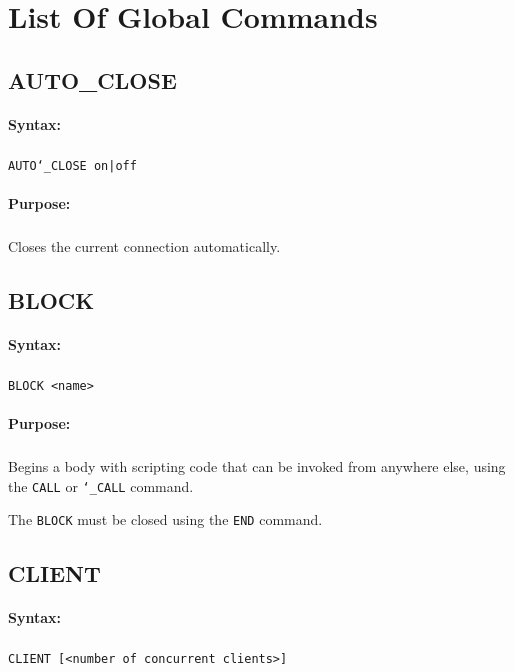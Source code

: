 \newpage
\section{List Of Global Commands}


\subsection{AUTO\_CLOSE}

\paragraph{Syntax:}
\subparagraph{}
\texttt{AUTO\char`\_CLOSE on|off}

\paragraph{Purpose:}
\subparagraph{}
Closes the current connection automatically.


\subsection{BLOCK}

\paragraph{Syntax:}
\subparagraph{}
\texttt{BLOCK <name>}

\paragraph{Purpose:}
\subparagraph{}
Begins a body with scripting code that can be invoked from anywhere 
else, using the \texttt{CALL} or \texttt{\char`\_CALL} command.

The \texttt{BLOCK} must be closed using the \texttt{END} command.


\subsection{CLIENT}

\paragraph{Syntax:}
\subparagraph{}
\texttt{CLIENT [<number of concurrent clients>]}

